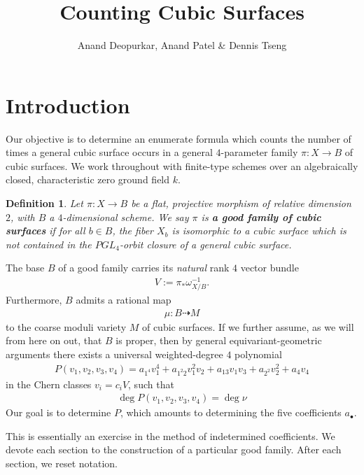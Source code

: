 \documentclass[12 pt]{amsart}
\title{Counting Cubic Surfaces}
\author{Anand Deopurkar, Anand Patel \& Dennis Tseng}
\newtheorem{definition}{Definition}[section]
\newcommand{\<}{\left\langle}
\renewcommand{\>}{\right\rangle}
\begin{document}
\maketitle


\section{Introduction}
\label{sec:intro}
Our objective is to determine an enumerate formula which counts the
number of times a general cubic surface occurs in a general
$4$-parameter family $ \pi: X \to B$ of cubic surfaces.  We work
throughout with finite-type schemes over an algebraically closed,
characteristic zero ground field $k$.


\begin{definition}
\label{def:goodfamily}
  Let $\pi :X \to B$ be a flat, projective morphism of relative
  dimension $2$, with $B$ a $4$-dimensional scheme. We say $\pi$ is
  {\bf a good family of cubic surfaces} if for all $b \in B$, the
  fiber $X_{b}$ is isomorphic to a cubic surface which is not
  contained in the $PGL_4$-orbit closure of a general cubic surface.
\end{definition}

The base $B$ of a good family carries its {\sl natural} rank $4$
vector bundle
\begin{align}
  \label{eq:V}
  V := \pi_{*}\omega_{X/B}^{-1}.
\end{align}
Furthermore, $B$ admits a rational map
\begin{align}
  \label{eq:mu}
  \mu: B \dashrightarrow M
\end{align}
to the coarse moduli variety $M$ of cubic surfaces. If we further
assume, as we will from here on out, that $B$ is proper, then by
general equivariant-geometric arguments there exists a universal
weighted-degree $4$ polynomial
\begin{align}
  \label{eq:P}
  P(v_1,v_2,v_3,v_4) = a_{1^4}v_{1}^{4} + a_{1^{2}2}v_{1}^{2}v_{2} + a_{13}v_{1}v_{3} + a_{2^2}v_{2}^{2} + a_{4}v_{4}
\end{align}
in the Chern classes $v_{i} = c_{i}V$, such that
\begin{align}
  \label{eq:equality}
  \deg P(v_{1},v_{2},v_{3},v_{4}) = \deg \nu
  \end{align}
Our goal is to determine $P$, which amounts to determining
the five coefficients $a_{\bullet}$.

This is essentially an exercise in the method of indetermined
coefficients. We devote each section to the construction of a
particular good family.  After each section, we reset notation.
\end{document}
